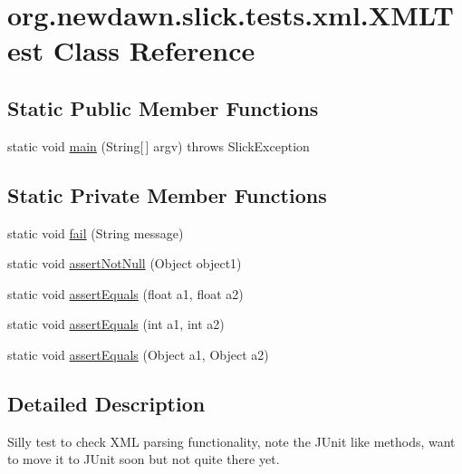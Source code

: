 \hypertarget{classorg_1_1newdawn_1_1slick_1_1tests_1_1xml_1_1_x_m_l_test}{}\section{org.\+newdawn.\+slick.\+tests.\+xml.\+X\+M\+L\+Test Class Reference}
\label{classorg_1_1newdawn_1_1slick_1_1tests_1_1xml_1_1_x_m_l_test}
\subsection*{Static Public Member Functions}
\begin{DoxyCompactItemize}
\item 
static void \mbox{\hyperlink{classorg_1_1newdawn_1_1slick_1_1tests_1_1xml_1_1_x_m_l_test_a6fe82594702b83a5d0dd0264b3d34562}{main}} (String\mbox{[}$\,$\mbox{]} argv)  throws Slick\+Exception 
\end{DoxyCompactItemize}
\subsection*{Static Private Member Functions}
\begin{DoxyCompactItemize}
\item 
static void \mbox{\hyperlink{classorg_1_1newdawn_1_1slick_1_1tests_1_1xml_1_1_x_m_l_test_a2ebb5c21c202786fb9222bee867ae91c}{fail}} (String message)
\item 
static void \mbox{\hyperlink{classorg_1_1newdawn_1_1slick_1_1tests_1_1xml_1_1_x_m_l_test_a516de8777172f1a41cb9ff310cc3b667}{assert\+Not\+Null}} (Object object1)
\item 
static void \mbox{\hyperlink{classorg_1_1newdawn_1_1slick_1_1tests_1_1xml_1_1_x_m_l_test_adbfd9cbd27f7f0377c936ef816a067ac}{assert\+Equals}} (float a1, float a2)
\item 
static void \mbox{\hyperlink{classorg_1_1newdawn_1_1slick_1_1tests_1_1xml_1_1_x_m_l_test_a362776dbdd8611cebc3203c860a79f92}{assert\+Equals}} (int a1, int a2)
\item 
static void \mbox{\hyperlink{classorg_1_1newdawn_1_1slick_1_1tests_1_1xml_1_1_x_m_l_test_a80cef1ae18e5a1eea6e6b2eaaeed2bc5}{assert\+Equals}} (Object a1, Object a2)
\end{DoxyCompactItemize}


\subsection{Detailed Description}
Silly test to check X\+ML parsing functionality, note the J\+Unit like methods, want to move it to J\+Unit soon but not quite there yet.

